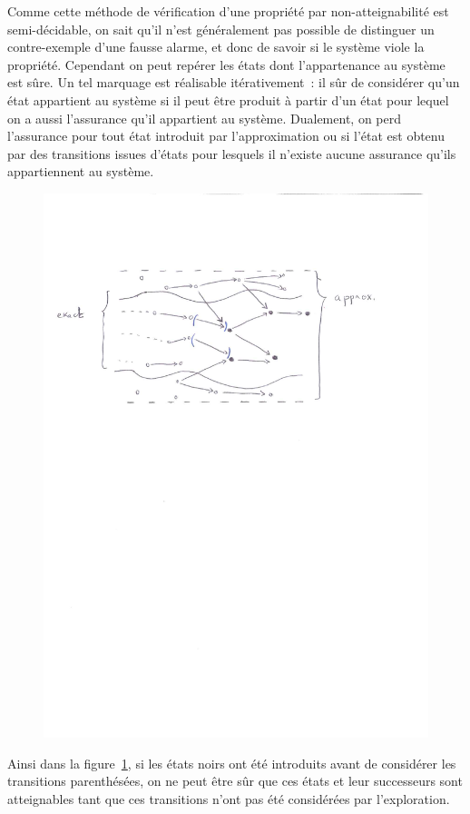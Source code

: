 Comme cette méthode de vérification d'une propriété par non-atteignabilité est semi-décidable,
on sait qu'il n'est généralement pas possible de distinguer un contre-exemple d'une fausse alarme,
et donc de savoir si le système viole la propriété.
Cependant on peut repérer les états dont l'appartenance au système est sûre. 
Un tel marquage est réalisable itérativement~: il sûr de considérer qu'un état
appartient au système si il peut être produit à partir d'un état pour lequel on a aussi l'assurance qu'il
appartient au système. Dualement, on perd l'assurance pour tout état introduit par l'approximation ou
si l'état est obtenu par des transitions issues d'états pour lesquels il n'existe aucune assurance
qu'ils appartiennent au système.
\begin{figure}[ht!]
  \centering
  \includegraphics[width=12cm]{4_contre_ex/illustration}
  \caption{\footnotesize }
  \label{fig:illustration}
\end{figure}
Ainsi dans la figure~\ref{fig:illustration}, si les états noirs ont été introduits avant de considérer les transitions
parenthésées, on ne peut être sûr que ces états et leur successeurs sont atteignables tant que 
ces transitions n'ont pas été considérées par l'exploration.

